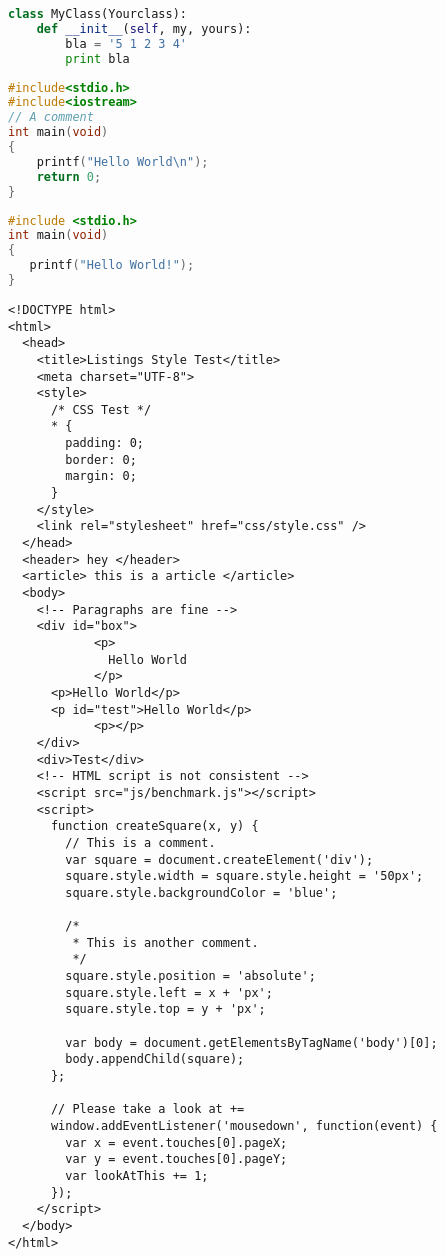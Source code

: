 \documentclass[a4paper,15pt]{article}
\begin{document}
\begin{lstlisting}[language=Python, style=pythonStyle]
class MyClass(Yourclass):
    def __init__(self, my, yours):
        bla = '5 1 2 3 4'
        print bla
\end{lstlisting}

\begin{lstlisting}[language=C++, style=cppStyle]
#include<stdio.h>
#include<iostream>
// A comment
int main(void)
{
    printf("Hello World\n");
    return 0;
}
\end{lstlisting}

\begin{lstlisting}[language=C, style=cStyle]
#include <stdio.h>
int main(void)
{
   printf("Hello World!"); 
}
\end{lstlisting}

\newpage

\begin{lstlisting}[style=htmlcssjsStyle]
<!DOCTYPE html>
<html>
  <head>
    <title>Listings Style Test</title>
    <meta charset="UTF-8">
    <style>
      /* CSS Test */
      * {
        padding: 0;
        border: 0;
        margin: 0;
      }
    </style>
    <link rel="stylesheet" href="css/style.css" />
  </head>
  <header> hey </header>
  <article> this is a article </article>
  <body>
    <!-- Paragraphs are fine -->
    <div id="box">			
			<p>
			  Hello World
			</p>
      <p>Hello World</p>
      <p id="test">Hello World</p>
			<p></p>
    </div>
    <div>Test</div>
    <!-- HTML script is not consistent -->
    <script src="js/benchmark.js"></script>
    <script>
      function createSquare(x, y) {
        // This is a comment.
        var square = document.createElement('div');
        square.style.width = square.style.height = '50px';
        square.style.backgroundColor = 'blue';
        
        /*
         * This is another comment.
         */
        square.style.position = 'absolute';
        square.style.left = x + 'px'; 
        square.style.top = y + 'px';
        
        var body = document.getElementsByTagName('body')[0];
        body.appendChild(square);
      };
      
      // Please take a look at +=
      window.addEventListener('mousedown', function(event) {
        var x = event.touches[0].pageX;
        var y = event.touches[0].pageY;
        var lookAtThis += 1;
      });
    </script>
  </body>
</html>
\end{lstlisting}
\end{document}
